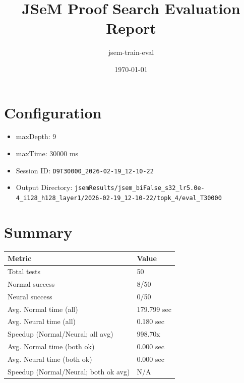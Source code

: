 \documentclass[a4paper,10pt]{article}
\title{JSeM Proof Search Evaluation Report}
\author{jsem-train-eval}
\date{\today}
\begin{document}
\maketitle

\section{Configuration}
\begin{itemize}
\item maxDepth: 9
\item maxTime: 30000 ms
\item Session ID: \texttt{D9T30000\_2026-02-19\_12-10-22}
\item Output Directory: \texttt{jsemResults/jsem\_biFalse\_s32\_lr5.0e-4\_i128\_h128\_layer1/2026-02-19\_12-10-22/topk\_4/eval\_T30000}
\end{itemize}

\section{Summary}
\begin{tabular}{ll}
\toprule
\textbf{Metric} & \textbf{Value} \\
\midrule
Total tests & 50 \\
Normal success & 8/50 \\
Neural success & 0/50 \\
\midrule
Avg. Normal time (all) & 179.799 sec \\
Avg. Neural time (all) & 0.180 sec \\
Speedup (Normal/Neural; all avg) & 998.70x \\
Avg. Normal time (both ok) & 0.000 sec \\
Avg. Neural time (both ok) & 0.000 sec \\
Speedup (Normal/Neural; both ok avg) & N/A \\
\bottomrule
\end{tabular}
\end{document}
